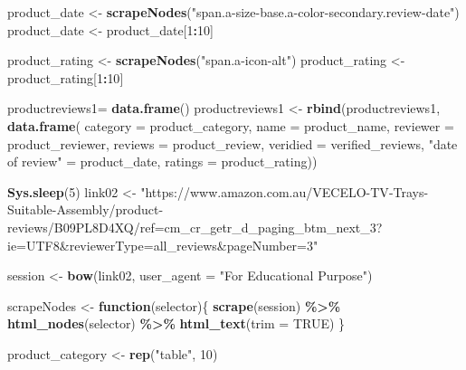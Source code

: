\documentclass[
]{article}
\newenvironment{Shaded}{\begin{snugshade}}{\end{snugshade}}
\newcommand{\AttributeTok}[1]{\textcolor[rgb]{0.13,0.29,0.53}{#1}}
\newcommand{\ConstantTok}[1]{\textcolor[rgb]{0.56,0.35,0.01}{#1}}
\newcommand{\ControlFlowTok}[1]{\textcolor[rgb]{0.13,0.29,0.53}{\textbf{#1}}}
\newcommand{\DecValTok}[1]{\textcolor[rgb]{0.00,0.00,0.81}{#1}}
\newcommand{\FunctionTok}[1]{\textcolor[rgb]{0.13,0.29,0.53}{\textbf{#1}}}
\newcommand{\NormalTok}[1]{#1}
\newcommand{\OtherTok}[1]{\textcolor[rgb]{0.56,0.35,0.01}{#1}}
\newcommand{\SpecialCharTok}[1]{\textcolor[rgb]{0.81,0.36,0.00}{\textbf{#1}}}
\newcommand{\StringTok}[1]{\textcolor[rgb]{0.31,0.60,0.02}{#1}}
\begin{document}
\begin{Shaded}
\begin{Highlighting}[]
\NormalTok{  product\_date }\OtherTok{\textless{}{-}} \FunctionTok{scrapeNodes}\NormalTok{(}\StringTok{"span.a{-}size{-}base.a{-}color{-}secondary.review{-}date"}\NormalTok{)}
\NormalTok{  product\_date }\OtherTok{\textless{}{-}}\NormalTok{ product\_date[}\DecValTok{1}\SpecialCharTok{:}\DecValTok{10}\NormalTok{]}
  
\NormalTok{  product\_rating }\OtherTok{\textless{}{-}} \FunctionTok{scrapeNodes}\NormalTok{(}\StringTok{"span.a{-}icon{-}alt"}\NormalTok{)}
\NormalTok{  product\_rating }\OtherTok{\textless{}{-}}\NormalTok{ product\_rating[}\DecValTok{1}\SpecialCharTok{:}\DecValTok{10}\NormalTok{]}
  
\NormalTok{  productreviews1}\OtherTok{=} \FunctionTok{data.frame}\NormalTok{()}
\NormalTok{  productreviews1 }\OtherTok{\textless{}{-}} \FunctionTok{rbind}\NormalTok{(productreviews1, }\FunctionTok{data.frame}\NormalTok{(}
                      \AttributeTok{category =}\NormalTok{ product\_category,}
                      \AttributeTok{name =}\NormalTok{ product\_name,}
                      \AttributeTok{reviewer =}\NormalTok{ product\_reviewer,}
                      \AttributeTok{reviews =}\NormalTok{ product\_review,}
                      \AttributeTok{veridied =}\NormalTok{ verified\_reviews,}
                      \StringTok{"date of review"} \OtherTok{=}\NormalTok{ product\_date,}
                      \AttributeTok{ratings =}\NormalTok{ product\_rating))}

  
 \FunctionTok{Sys.sleep}\NormalTok{(}\DecValTok{5}\NormalTok{)}
\NormalTok{link02 }\OtherTok{\textless{}{-}} \StringTok{"https://www.amazon.com.au/VECELO{-}TV{-}Trays{-}Suitable{-}Assembly/product{-}reviews/B09PL8D4XQ/ref=cm\_cr\_getr\_d\_paging\_btm\_next\_3?ie=UTF8\&reviewerType=all\_reviews\&pageNumber=3"}


\NormalTok{  session }\OtherTok{\textless{}{-}} \FunctionTok{bow}\NormalTok{(link02,}
               \AttributeTok{user\_agent =} \StringTok{"For Educational Purpose"}\NormalTok{)}

\NormalTok{  scrapeNodes }\OtherTok{\textless{}{-}} \ControlFlowTok{function}\NormalTok{(selector)\{}
    \FunctionTok{scrape}\NormalTok{(session) }\SpecialCharTok{\%\textgreater{}\%}
      \FunctionTok{html\_nodes}\NormalTok{(selector) }\SpecialCharTok{\%\textgreater{}\%}
      \FunctionTok{html\_text}\NormalTok{(}\AttributeTok{trim =} \ConstantTok{TRUE}\NormalTok{)}
\NormalTok{  \}}

\NormalTok{  product\_category }\OtherTok{\textless{}{-}} \FunctionTok{rep}\NormalTok{(}\StringTok{"table"}\NormalTok{, }\DecValTok{10}\NormalTok{)}


\end{Highlighting}
\end{Shaded}
\end{document}
